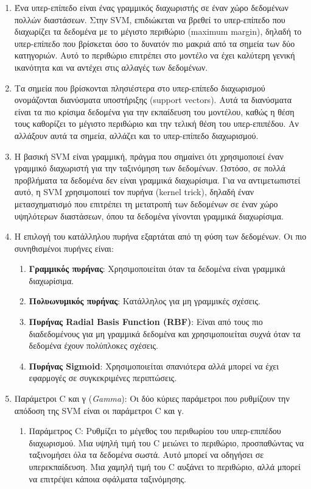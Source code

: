\documentclass[diploma]{softlab-thesis}
\begin{document}
\begin{enumerate}
\item Ένα υπερ-επίπεδο είναι ένας γραμμικός διαχωριστής σε έναν χώρο δεδομένων πολλών διαστάσεων. Στην SVM, επιδιώκεται να βρεθεί το υπερ-επίπεδο που διαχωρίζει τα δεδομένα με το μέγιστο περιθώριο (maximum margin), δηλαδή το υπερ-επίπεδο που βρίσκεται όσο το δυνατόν πιο μακριά από τα σημεία των δύο κατηγοριών. Αυτό το περιθώριο επιτρέπει στο μοντέλο να έχει καλύτερη γενική ικανότητα και να αντέχει στις αλλαγές των δεδομένων.
\item Τα σημεία που βρίσκονται πλησιέστερα στο υπερ-επίπεδο διαχωρισμού ονομάζονται διανύσματα υποστήριξης (support vectors). Αυτά τα διανύσματα είναι τα πιο κρίσιμα δεδομένα για την εκπαίδευση του μοντέλου, καθώς η θέση τους καθορίζει το μέγιστο περιθώριο και την τελική θέση του υπερ-επιπέδου. Αν αλλάξουν αυτά τα σημεία, αλλάζει και το υπερ-επίπεδο διαχωρισμού.
\item Η βασική SVM είναι γραμμική, πράγμα που σημαίνει ότι χρησιμοποιεί έναν γραμμικό διαχωριστή για την ταξινόμηση των δεδομένων. Ωστόσο, σε πολλά προβλήματα τα δεδομένα δεν είναι γραμμικά διαχωρίσιμα. Για να αντιμετωπιστεί αυτό, η SVM χρησιμοποιεί τον πυρήνα (kernel trick), δηλαδή έναν μετασχηματισμό που επιτρέπει τη μετατροπή των δεδομένων σε έναν χώρο υψηλότερων διαστάσεων, όπου τα δεδομένα γίνονται γραμμικά διαχωρίσιμα.
\item Η επιλογή του κατάλληλου πυρήνα εξαρτάται από τη φύση των δεδομένων. Οι πιο συνηθισμένοι πυρήνες είναι:
\begin{enumerate}
\item{\textbf{Γραμμικός πυρήνας}}: Χρησιμοποιείται όταν τα δεδομένα είναι γραμμικά διαχωρίσιμα.
\item{\textbf{Πολυωνυμικός πυρήνας}}: Κατάλληλος για μη γραμμικές σχέσεις.
\item {\textbf{Πυρήνας Radial Basis Function (RBF)}}: Είναι από τους πιο διαδεδομένους για μη γραμμικά δεδομένα και χρησιμοποιείται συχνά όταν τα δεδομένα έχουν πολύπλοκες σχέσεις.
\item {\textbf{Πυρήνας Sigmoid}}: Χρησιμοποιείται σπανιότερα αλλά μπορεί να έχει εφαρμογές σε συγκεκριμένες περιπτώσεις.
\end{enumerate}
\item Παράμετροι C και γ (\textit{Gamma}): Οι δύο κύριες παράμετροι που ρυθμίζουν την απόδοση της SVM είναι οι παράμετροι C και γ.
\begin{enumerate}
\item Παράμετρος C: Ρυθμίζει το μέγεθος του περιθωρίου του υπερ-επιπέδου διαχωρισμού. Μια υψηλή τιμή του C μειώνει το περιθώριο, προσπαθώντας να ταξινομήσει όλα τα δεδομένα σωστά. Αυτό μπορεί να οδηγήσει σε υπερεκπαίδευση. Μια χαμηλή τιμή του C αυξάνει το περιθώριο, αλλά μπορεί να επιτρέψει κάποια σφάλματα ταξινόμησης.

\end{enumerate}
\end{enumerate}
\end{document}
